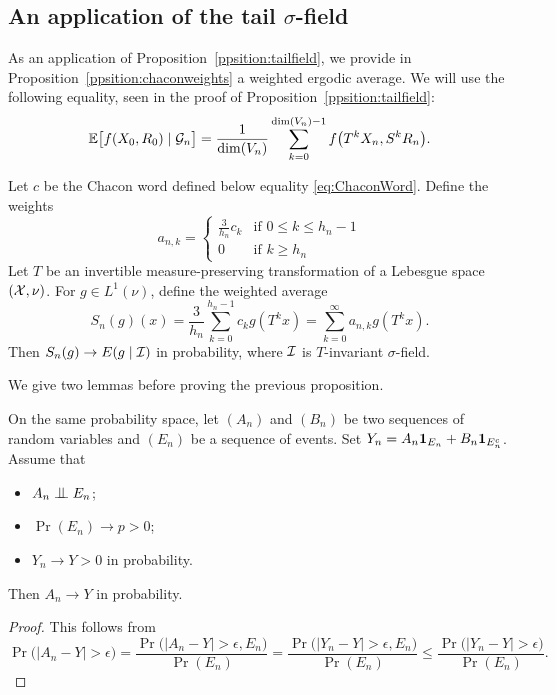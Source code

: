 \documentclass[12pt,a4paper]{article}
\begin{document}
\subsection{An application of the tail $\sigma$-field}

As an application of Proposition~\ref{ppsition:tailfield}, 
we provide in Proposition~\ref{ppsition:chaconweights} a 
weighted ergodic average.
We will use the following equality, seen in the proof of Proposition~\ref{ppsition:tailfield}: 
\begin{equation}\label{eq:conditionalexpectation}
\mathbb{E}\bigl[f(X_0, R_0) \mid \mathcal{G}_n\bigr]
 =\frac{1}{\dim(V_n)}\sum_{k=0}^{\dim(V_n)-1} f\bigl(T^kX_n, S^kR_n \bigr).
\end{equation}

\begin{ppsition}\label{ppsition:chaconweights}
Let $c$ be the Chacon word defined below equality \eqref{eq:ChaconWord}. 
Define the weights 
$$
a_{n,k} = \begin{cases}
\frac{3}{h_n} c_k & \text{if $0 \leq k \leq h_n-1$} \\
0 & \text{if $k \geq h_n$}
\end{cases}
$$
Let $T$ be an invertible measure-preserving transformation of a Lebesgue space 
$(\mathcal{X}, \nu)$. 
For $g \in L^1(\nu)$, define the weighted average
$$
S_n(g)(x) = \frac{3}{h_n}\sum_{k=0}^{h_n-1} c_k g(T^kx) 
= \sum_{k=0}^\infty a_{n,k} g(T^kx).  
$$ 
Then $S_n(g) \to E(g \mid {\cal I})$ in probability, 
where ${\cal I}$ is $T$-invariant $\sigma$-field.
\end{ppsition}

We give two lemmas before proving the previous proposition.

\begin{lemma}\label{lemme:convergence}
On the same probability space, let $(A_n)$ and $(B_n)$ be two 
sequences of random variables and $(E_n)$ be a sequence of events. 
Set $Y_n = A_n \boldsymbol 1_{E_n} + B_n \boldsymbol 1_{E_n^c}$. 
Assume that 
\begin{itemize}
\item $A_n \indep E_n$;

\item $\Pr(E_n) \to p>0$;

\item $Y_n \to Y >0$ in probability.
\end{itemize}
Then $A_n \to Y$ in probability.
\end{lemma}

\begin{proof}
This follows from
$$
\Pr\bigl(|A_n - Y|> \epsilon\bigr) = 
\frac{\Pr\bigl(|A_n - Y|> \epsilon, E_n\bigr)}{\Pr(E_n)} 
= \frac{\Pr\bigl(|Y_n - Y|> \epsilon, E_n\bigr)}{\Pr(E_n)} 
\leq \frac{\Pr\bigl(|Y_n - Y|> \epsilon)}{\Pr(E_n)}.  
$$
\end{proof}
\end{document}
